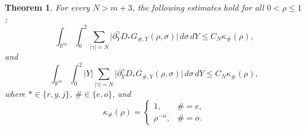 \documentclass[12pt]{amsart}
\newtheorem{theorem}{Theorem}[section]
\begin{document}
\begin{theorem}\label{thm:Green:n=1:secondtolast}
For every $N>m+3$, the following estimates hold for all $0<\rho\le 1$:
\begin{equation}
    \int_{\mathbb{R}^m} \int_0^2 \sum_{|\gamma|=N} \bigl| \partial_Y^{\gamma} D_* G_{\#,Y}(\rho,\sigma) \bigr| \, d\sigma \, dY \le C_N \kappa_{\#}(\rho),
\end{equation}
and
\begin{equation}
    \int_{\mathbb{R}^m} \int_0^2 |Y| \sum_{|\gamma|=N} \bigl| \partial_Y^{\gamma} D_* G_{\#,Y}(\rho,\sigma) \bigr| \, d\sigma \, dY \le C_N \kappa_{\#}(\rho),
\end{equation}
where $*\in\{r,y,j\}$, $\# \in \{ e,o\}$, and
\begin{equation*}
    \kappa_{\#}(\rho) = \begin{cases}
        1, & \# = e,\\[4pt]
        \rho^{-\alpha}, & \# = o.
    \end{cases}
\end{equation*}
\end{theorem}
\end{document}
